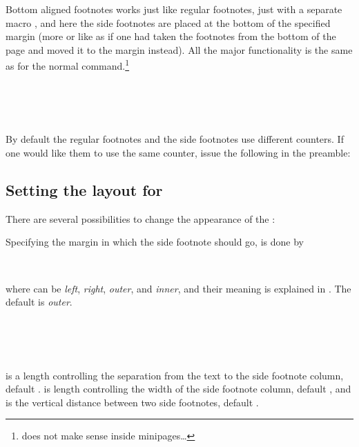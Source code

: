 \documentclass[10pt,a4paper,extrafontsizes]{memoir}
\begin{document}
Bottom aligned footnotes works just like regular footnotes, just with
a separate macro \cmd{\sidefootenote}, and here the side
footnotes are placed at the bottom of the specified margin (more or
like as if one had taken the footnotes from the bottom of the page and
moved it to the margin instead). All the major functionality is the
same as for the normal \cmd{\footnote}
command.\footnote{ does not make sense inside
  minipages\dots}
\begin{syntax}
  \cmd{\sidefootnote}\\
  \cmd{\sidefootnotemark}\\
  \cmd{\sidefootnotetext}\\
\end{syntax}

By default the regular footnotes and the side footnotes use different
counters. If one would like them to use the same counter, issue the
following in the preamble:
\begin{lcode}
\end{lcode}


\subsection{Setting the layout for
  \texorpdfstring{}{sidefootnote}} 
\label{sec:sett-layo-texorpdfst}



There are several possibilities to change the appearance of the
\cmd{\sidefootnote}:

Specifying the margin in which the side footnote should go, is done by 
\begin{syntax}
  \cmd{\sidefootmargin}\\
\end{syntax}
where  can be \emph{left}, \emph{right}, \emph{outer}, and
\emph{inner}, and their meaning is explained in
. The default is \emph{outer}.

\begin{syntax}
  \lnc{\sidefoothsep}\\
  \lnc{\sidefootwidth}\\
  \lnc{\sidefootvsep}\\
\end{syntax}
\cmd{\sidefoothsep} is a length controlling the separation from the
text to the side footnote column, default
\cmd{\marginparsep}. \cmd{\sidefootwidth} is length controlling the
width of the side footnote column, default \cmd{\marginparwidth}, and
\cmd{\sidefootvsep} is the vertical distance between two side
footnotes, default \cmd{\onelineskip}.
\end{document}

